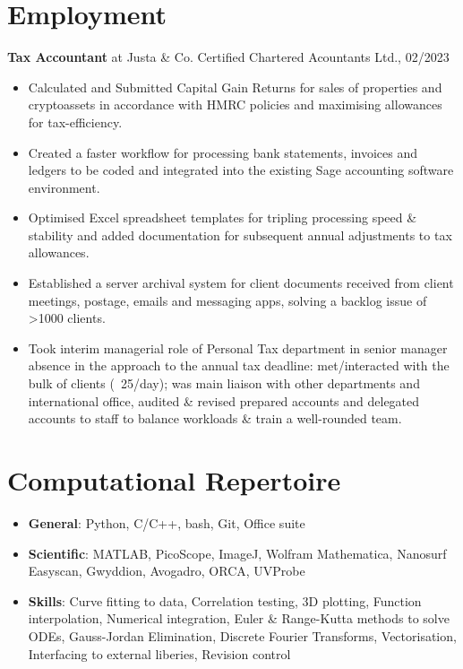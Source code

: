 \documentclass[a4paper]{article}
\begin{document}
\section{Employment}
\textbf{Tax Accountant} at  Justa \& Co. Certified Chartered Acountants Ltd., 02/2023

\begin{itemize}
	\item Calculated and Submitted Capital Gain Returns for sales of properties and cryptoassets in
		accordance with HMRC policies and maximising allowances for tax-efficiency.	
	\item Created a faster workflow for processing bank statements, invoices and ledgers to be
		coded and integrated into the existing Sage accounting software environment.
	\item Optimised Excel spreadsheet templates for tripling processing speed \& stability and added
		documentation for subsequent annual adjustments to tax allowances.
	\item Established a server archival system for client documents received from client meetings,
		postage, emails and messaging apps, solving a backlog issue of >1000 clients.
	\item Took interim managerial role of Personal Tax department in senior manager absence in the
		approach to the annual tax deadline: met/interacted with the bulk of clients
		(~25/day); was main liaison with other departments and international office,
		audited \& revised prepared accounts and delegated accounts to staff to balance
		workloads \& train a well-rounded team.
\end{itemize}



\section{Computational Repertoire}



\begin{itemize}
	\item \textbf{General}: Python, C/C++, bash, Git, Office suite
	\item \textbf{Scientific}: MATLAB, PicoScope, ImageJ, Wolfram Mathematica, Nanosurf Easyscan, Gwyddion, Avogadro, ORCA, UVProbe
	\item \textbf{Skills}: Curve fitting to data, Correlation testing, 3D plotting, Function interpolation, Numerical integration, Euler \& Range-Kutta methods to solve ODEs, Gauss-Jordan Elimination, Discrete Fourier Transforms, Vectorisation, Interfacing to external liberies, Revision control
\end{itemize}
\end{document}
